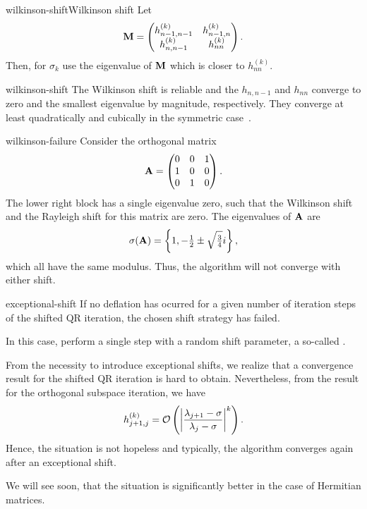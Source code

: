 \begin{Definition*}{wilkinson-shift}{Wilkinson shift}
  Let
  \begin{gather}
    \matm =
    \begin{pmatrix}
      h_{n-1,n-1}^{(k)}&h_{n-1,n}^{(k)}\\h_{n,n-1}^{(k)}&h_{nn}^{(k)}
    \end{pmatrix}.
  \end{gather}
  Then, for $\sigma_k$ use the eigenvalue of $\matm$ which is closer
  to $h_{nn}^{(k)}$.
\end{Definition*}

\begin{Remark}{wilkinson-shift}
  The Wilkinson shift is reliable and the $h_{n,n-1}$ and $h_{nn}$
  converge to zero and the smallest eigenvalue by magnitude,
  respectively. They converge at least quadratically and cubically in
  the symmetric case~\cite[Section 8.2]{GolubVanLoan83}.
\end{Remark}

\begin{Example}{wilkinson-failure}
  Consider the orthogonal matrix
  \begin{gather}
    \mata =
    \begin{pmatrix}
      0&0&1\\1&0&0\\0&1&0
    \end{pmatrix}.
  \end{gather}
  The lower right block has a single eigenvalue zero, such that the
  Wilkinson shift and the Rayleigh shift for this matrix are zero. The eigenvalues of $\mata$ are
  \begin{gather}
    \sigma(\mata) = \left\{1, -\tfrac12 \pm \sqrt{\tfrac34}i\right\},
  \end{gather}
  which all have the same modulus. Thus, the algorithm will not converge with either shift.
\end{Example}

\begin{Algorithm}{exceptional-shift}
  If no deflation has ocurred for a given number of iteration steps of
  the shifted QR iteration, the chosen shift strategy has failed.

  In this case, perform a single step with a random shift parameter, a
  so-called .
\end{Algorithm}

\begin{remark}
  From the necessity to introduce exceptional shifts, we realize that
  a convergence result for the shifted QR iteration is hard to
  obtain. Nevertheless, from the result for the orthogonal subspace
  iteration, we have
  \begin{gather}
    h_{j+1,j}^{(k)} = \bigo \left(\abs*{\frac{\lambda_{j+1}-\sigma}{\lambda_j-\sigma}}^k\right).
  \end{gather}
  Hence, the situation is not hopeless and typically, the algorithm
  converges again after an exceptional shift.

  We will see soon, that the situation is significantly better in the
  case of Hermitian matrices.
\end{remark}

